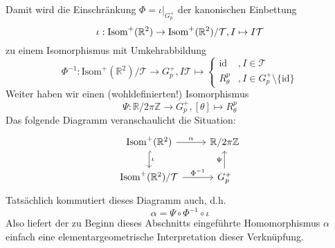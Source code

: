 \documentclass[a4paper, ngerman]{article}
\numberwithin{equation}{chapter}
\theoremstyle{plain}
\theoremstyle{definition}
\newcommand{\id}{\ensuremath{\text{id}}}
\newcommand{\geradisometr}{\ensuremath{\mathrm{Isom}^+(\mathbb R^2)}}
\begin{document}
Damit wird die Einschränkung \(\Phi = \iota|_{G_p^+}\) der kanonischen Einbettung
\begin{equation*}
    \iota: \geradisometr \break \to \geradisometr/\mathcal T, I \mapsto I\mathcal T
\end{equation*}
zu einem Isomorphismus mit Umkehrabbildung 
\begin{equation*}
    \Phi^{-1}: \geradisometr/\mathcal T \to G_p^+, I\mathcal T \mapsto 
    \begin{cases}
        \id &, I \in \mathcal T \\
        R_\theta^p &, I \in G_p^+\setminus \{\id\}
    \end{cases}
\end{equation*}
Weiter haben wir einen (wohldefinierten!) Isomorphismus 
\begin{equation*}
    \Psi: \mathbb R/2\pi\mathbb Z \to G_p^+, [\theta] \mapsto R_\theta^p
\end{equation*}
Das folgende Diagramm veranschaulicht die Situation:
\begin{equation*}
    \begin{tikzcd}
        \geradisometr \arrow[hook]{d}{\iota} \arrow{r}{\alpha} & \mathbb R/2\pi\mathbb Z \\
        \geradisometr/\mathcal T \arrow{r}{\Phi^{-1}} & G_p^+ \arrow{u}{\Psi}
    \end{tikzcd}
\end{equation*}
Tatsächlich kommutiert dieses Diagramm auch, d.h. 
\begin{equation*}
    \alpha = \Psi\circ \Phi^{-1}\circ \iota
\end{equation*}
Also liefert der zu Beginn dieses Abschnitts eingeführte Homomorphismus \(\alpha\) einfach eine elementargeometrische Interpretation dieser Verknüpfung. 
\end{document}
